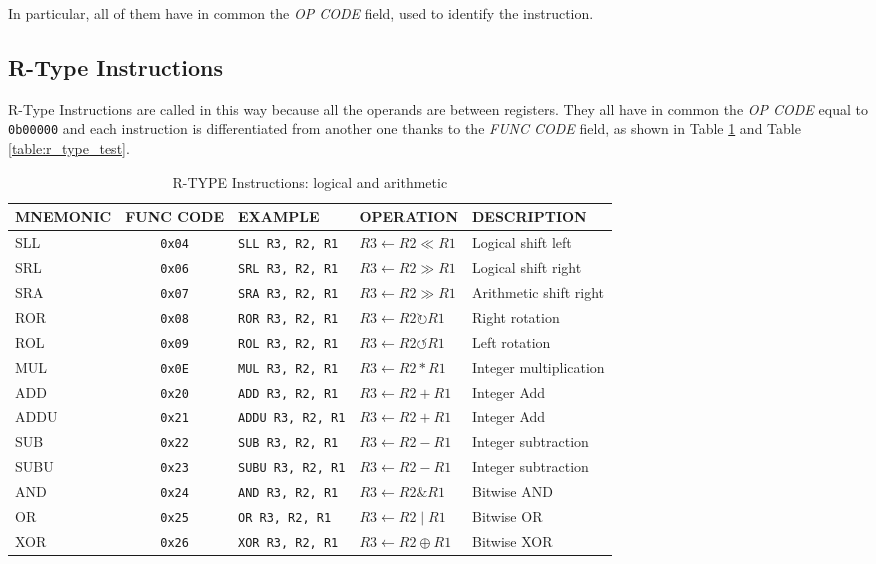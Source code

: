 In particular, all of them have in common the \emph{OP CODE} field, used to identify the instruction.

\subsection{R-Type Instructions}

R-Type Instructions are called in this way because all the operands are between registers. They all have in common the \emph{OP CODE} equal to \texttt{0b00000} and each instruction is differentiated from another one thanks to the \emph{FUNC CODE} field, as shown in Table \ref{table:r_type} and Table \ref{table:r_type_test}.

\begin{table}[H]
\begin{tabularx}{\textwidth}{|l|c|l|l|X|}
    \hline
    MNEMONIC & FUNC CODE & EXAMPLE & OPERATION & DESCRIPTION \\ 
    \hline
    SLL & \texttt{0x04} & \texttt{SLL R3, R2, R1} & $R3 \leftarrow R2 \ll R1$ & Logical shift left\\ 
    \hline
    SRL & \texttt{0x06} & \texttt{SRL R3, R2, R1} & $R3 \leftarrow R2 \gg R1$ & Logical shift right\\ 
    \hline
    SRA & \texttt{0x07} & \texttt{SRA R3, R2, R1} & $R3 \leftarrow R2 \gg R1$ & Arithmetic shift right\\ 
    \hline
    ROR & \texttt{0x08} & \texttt{ROR R3, R2, R1} & $R3 \leftarrow R2 \circlearrowright R1$ & Right rotation\\ 
    \hline
    ROL & \texttt{0x09} & \texttt{ROL R3, R2, R1} & $R3 \leftarrow R2 \circlearrowleft R1$ & Left rotation\\ 
    \hline
    MUL & \texttt{0x0E} & \texttt{MUL R3, R2, R1} & $R3 \leftarrow R2 * R1$ & Integer multiplication\\ 
    \hline
    ADD & \texttt{0x20} & \texttt{ADD R3, R2, R1} & $R3 \leftarrow R2 + R1$ & Integer Add\\ 
    \hline
    ADDU & \texttt{0x21} & \texttt{ADDU R3, R2, R1} & $R3 \leftarrow R2 + R1$ & Integer Add\\ 
    \hline
    SUB & \texttt{0x22} & \texttt{SUB R3, R2, R1} & $R3 \leftarrow R2 - R1$ & Integer subtraction\\ 
    \hline
    SUBU & \texttt{0x23} & \texttt{SUBU R3, R2, R1} & $R3 \leftarrow R2 - R1$ & Integer subtraction\\ 
    \hline
    AND & \texttt{0x24} & \texttt{AND R3, R2, R1} & $R3 \leftarrow R2 \texttt{\&} R1$ & Bitwise AND\\ 
    \hline
    OR & \texttt{0x25} & \texttt{OR R3, R2, R1} & $R3 \leftarrow R2 \mid R1$ & Bitwise OR\\ 
    \hline
    XOR & \texttt{0x26} & \texttt{XOR R3, R2, R1} & $R3 \leftarrow R2 \oplus R1$ & Bitwise XOR\\ 
    \hline
\end{tabularx}
\caption{R-TYPE Instructions: logical and arithmetic}
\label{table:r_type}
\end{table}


